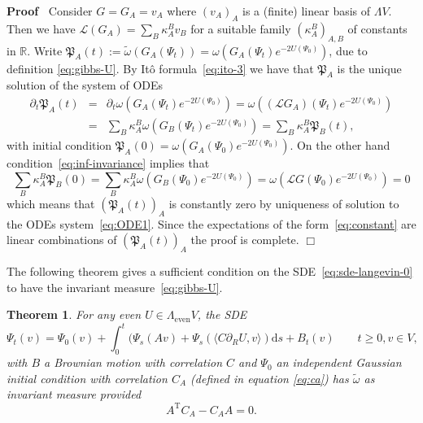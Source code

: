 \documentclass{article}
\newcommand{\Tau}{\mathrm{T}}
\newcommand{\assign}{:=}
\newcommand{\mathd}{\mathrm{d}}
\newcommand{\nobracket}{}
\newcommand{\tmop}[1]{\ensuremath{\operatorname{#1}}}
\newenvironment{proof}{\noindent\textbf{Proof\ }}{\hspace*{\fill}$\Box$\medskip}
\newtheorem{theorem}{Theorem}
\begin{document}
\begin{proof}
  Consider $G = G_A = v_A$ where $(v_A)_A$ is a (finite) linear basis of
  $\Lambda V$. Then we have $\mathcal{L} (G_A) = \sum_B \kappa_A^B v_B$ for a
  suitable family $(\kappa_A^B)_{A, B}$ of constants in $\mathbb{R}$. Write
  $\mathfrak{P}_A (t) \assign \tilde{\omega} (G_A (\Psi_t)) = \omega (G_A
  (\Psi_t) e^{- 2 U (\Psi_0)})$, due to definition {\eqref{eq:gibbs-U}}. By
  It{\^o} formula~{\eqref{eq:ito-3}} we have that $\mathfrak{P}_A$ is the
  unique solution of the system of ODEs
  \begin{eqnarray}
    \partial_t \mathfrak{P}_A (t) & = & \partial_t \omega (G_A (\Psi_t) e^{- 2
    U (\Psi_0)}) = \omega ((\mathcal{L} G_A) (\Psi_t) e^{- 2 U (\Psi_0)})
    \nonumber\\
    & = & \sum_B \kappa_A^B \omega (G_B (\Psi_t) e^{- 2 U (\Psi_0)}) = \sum_B
    \kappa^B_A \mathfrak{P}_B (t), \label{eq:ODE1} 
  \end{eqnarray}
  with initial condition $\mathfrak{P}_A (0) = \omega (G_A (\Psi_0) e^{- 2 U
  (\Psi_0)})$. On the other hand condition~{\eqref{eq:inf-invariance}} implies
  that
  \[ \sum_B \kappa^B_A \mathfrak{P}_B (0) = \sum_B \kappa^B_A \omega (G_B
     (\Psi_0) e^{- 2 U (\Psi_0)}) = \omega (\mathcal{L}G (\Psi_0) e^{- 2 U
     (\Psi_0)}) = 0 \]
  which means that $(\mathfrak{P}_A (t))_A$ is constantly zero by uniqueness
  of solution to the ODEs system~{\eqref{eq:ODE1}}. Since the expectations of
  the form~{\eqref{eq:constant}} are linear combinations of $(\mathfrak{P}_A
  (t))_A$ the proof is complete.
\end{proof}

The following theorem gives a sufficient condition on the
SDE~{\eqref{eq:sde-langevin-0}} to have the invariant
measure~{\eqref{eq:gibbs-U}}.

\begin{theorem}
  \label{th:sq-finite}For any even $U \in \Lambda_{\tmop{even}} V$, the SDE
  \begin{equation}
    \Psi_t (v) = \Psi_0 (v) + \int_0^t (\Psi_s (A v) + \Psi_s (\langle C
    \partial_R U, v \rangle) \nobracket \mathd s + B_t (v) \qquad t \geqslant
    0, v \in V, \label{eq:sde-langevin}
  \end{equation}
  with $B$ a Brownian motion with correlation $C$ and $\Psi_0$ an independent
  Gaussian initial condition with correlation $C_A$ (defined in equation
  {\eqref{eq:ca}}) has $\tilde{\omega}$ as invariant measure provided
  \begin{equation}
    A^{\Tau} C_A - C_A A = 0. \label{eq:gradient}
  \end{equation}
\end{theorem}
\end{document}
